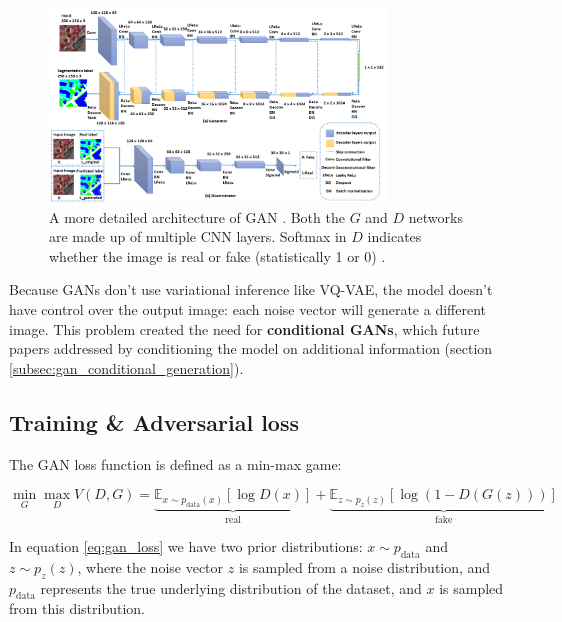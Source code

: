 \begin{figure}
    \centering
    \includegraphics[width=0.8\textwidth]{images/gan/gan_architecture.png}
    \caption{A more detailed architecture of GAN \cite{gan_architecture_figure_paper}. Both the $G$ and $D$ networks are made up of multiple CNN layers. Softmax in $D$ indicates whether the image is real or fake (statistically 1 or 0) \cite{gan_architecture_figure_paper}.}
    \label{fig:gan_architecture}
\end{figure}

Because GANs don't use variational inference like VQ-VAE, the model doesn't have control over the output image: each noise vector will generate a different image. This problem created the need for \textbf{conditional GANs}, which future papers addressed by conditioning the model on additional information (section \ref{subsec:gan_conditional_generation}).




\subsection{Training \& Adversarial loss}
\label{subsec:gan_training}

The GAN loss function is defined as a min-max game:

\begin{equation}
    \label{eq:gan_loss}
    \min_G \max_D V(D,G) = 
    \underbrace{\mathbb{E}_{x \sim p_{\text{data}}(x)}[\log D(x)]}_{\text{real}} + 
    \underbrace{\mathbb{E}_{z \sim p_z(z)}[\log(1 - D(G(z)))]}_{\text{fake}}
\end{equation}

In equation \ref{eq:gan_loss} we have two prior distributions: $x \sim p_{\text{data}}$ and $z \sim p_z(z)$, where the noise vector $z$ is sampled from a noise distribution, and $p_{\text{data}}$ represents the true underlying distribution of the dataset, and $x$ is sampled from this distribution.

